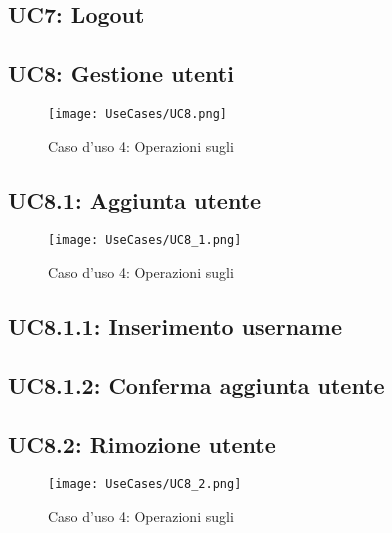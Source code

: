 \documentclass{scalatekids-article}
\begin{document}
\subsection{UC7: Logout}

\subsection{UC8: Gestione utenti}

\begin{figure}[H]
  \begin{center}
    \texttt{[image: UseCases/UC8.png]}
    \caption*{Caso d'uso 4: Operazioni sugli }
  \end{center}
\end{figure}

\subsection{UC8.1: Aggiunta utente}

\begin{figure}[H]
  \begin{center}
    \texttt{[image: UseCases/UC8\_1.png]}
    \caption*{Caso d'uso 4: Operazioni sugli }
  \end{center}
\end{figure}

\subsection{UC8.1.1: Inserimento username}

\subsection{UC8.1.2: Conferma aggiunta utente}

\subsection{UC8.2: Rimozione utente}

\begin{figure}[H]
  \begin{center}
    \texttt{[image: UseCases/UC8\_2.png]}
    \caption*{Caso d'uso 4: Operazioni sugli }
  \end{center}
\end{figure}
\end{document}
